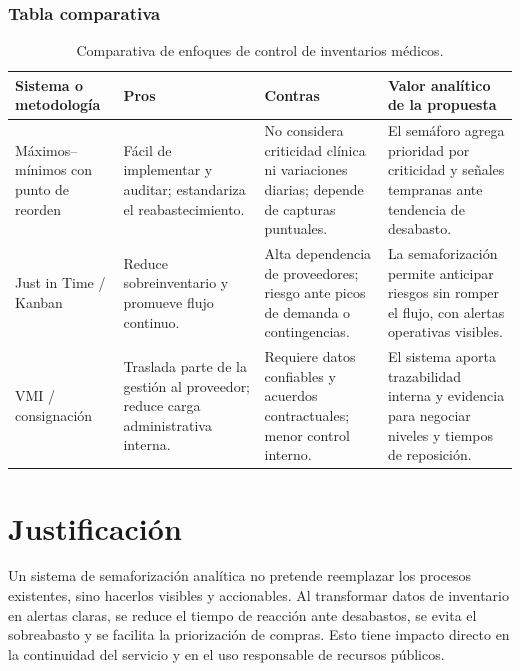\subsubsection{Tabla comparativa}
\label{subsubsec:tabla_comparativa}

\begin{table}[!tbh]
    \centering
    \caption{Comparativa de enfoques de control de inventarios médicos.}
    \label{tab:comparativa_inventarios}
    \begin{tabular}{|L{3.0cm}|L{4.0cm}|L{4.0cm}|L{4.0cm}|}
        \hline
        \textbf{Sistema o metodología} & \textbf{Pros} & \textbf{Contras} & \textbf{Valor analítico de la propuesta} \\
        \hline
        Máximos--mínimos con punto de reorden & Fácil de implementar y auditar; estandariza el reabastecimiento. & No considera criticidad clínica ni variaciones diarias; depende de capturas puntuales. & El semáforo agrega prioridad por criticidad y señales tempranas ante tendencia de desabasto. \\
        \hline
        Just in Time / Kanban & Reduce sobreinventario y promueve flujo continuo. & Alta dependencia de proveedores; riesgo ante picos de demanda o contingencias. & La semaforización permite anticipar riesgos sin romper el flujo, con alertas operativas visibles. \\
        \hline
        VMI / consignación & Traslada parte de la gestión al proveedor; reduce carga administrativa interna. & Requiere datos confiables y acuerdos contractuales; menor control interno. & El sistema aporta trazabilidad interna y evidencia para negociar niveles y tiempos de reposición. \\
        \hline
    \end{tabular}
\end{table}

\section{Justificación}
\label{sec:justificacion}

Un sistema de semaforización analítica no pretende reemplazar los procesos existentes, sino hacerlos visibles y accionables. Al transformar datos de inventario en alertas claras, se reduce el tiempo de reacción ante desabastos, se evita el sobreabasto y se facilita la priorización de compras. Esto tiene impacto directo en la continuidad del servicio y en el uso responsable de recursos públicos.

